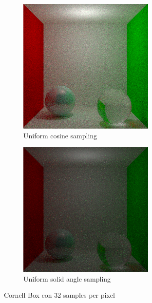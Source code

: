 \documentclass{article}
\begin{document}
\begin{figure}
\begin{subfigure}[h]{0.4\linewidth}
\includegraphics[width=\linewidth]{imgs/cosine_box32.png}
\caption{Uniform cosine sampling}
\end{subfigure}
\hfill
\begin{subfigure}[h]{0.4\linewidth}
\includegraphics[width=\linewidth]{imgs/solid_angle_box32.png}
\caption{Uniform solid angle sampling}
\end{subfigure}%
\caption{Cornell Box con 32 samples per pixel}
\end{figure}
\end{document}
